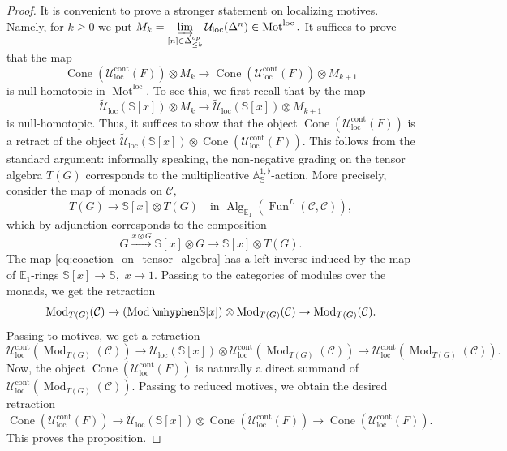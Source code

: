 \documentclass[11pt,leqno]{amsart}
\numberwithin{equation}{section}
\def\A{{\mathbb A}}
\def\bS{\mathbb{S}}
\def\wt{\widetilde}
\newcommand{\hy}{\mhyphen}
\newcommand{\indlim}[1][]{\mathop{\varinjlim}\limits_{#1}}
\newcommand{\xto}{\xrightarrow}
\newcommand{\Mot}{\operatorname{Mot}}
\newcommand{\Cone}{\operatorname{Cone}}
\newcommand{\loc}{\operatorname{loc}}
\newcommand{\cont}{\operatorname{cont}}
\newcommand{\bE}{{\mathbb E}}
\newcommand{\cC}{{\mathcal C}}
\newcommand{\cU}{{\mathcal U}}
\newcommand{\Fun}{\operatorname{Fun}}
\newcommand{\Alg}{\operatorname{Alg}}
\newcommand{\Mod}{\operatorname{Mod}}
\begin{document}
\begin{proof}
It is convenient to prove a stronger statement on localizing motives. Namely, for $k\geq 0$ we put $M_k=\indlim[\substack{[n]\in\Delta_{\leq k}^{op}}] \cU_{\loc}(\Delta^n)\in\Mot^{\loc}.$ It suffices to prove that the map
\begin{equation*}
\Cone(\cU_{\loc}^{\cont}(F))\otimes M_k\to \Cone(\cU_{\loc}^{\cont}(F))\otimes M_{k+1}
\end{equation*}
is null-homotopic in $\Mot^{\loc}.$ To see this, we first recall that by \cite[Proofs of Theorem 8.1 and Proposition 8.2]{E25c} the map
\begin{equation*}
\wt{\cU}_{\loc}(\bS[x])\otimes M_k\to \wt{\cU}_{\loc}(\bS[x])\otimes M_{k+1}
\end{equation*}
is null-homotopic. Thus, it suffices to show that the object $\Cone(\cU_{\loc}^{\cont}(F))$ is a retract of the object $\wt{\cU}_{\loc}(\bS[x])\otimes \Cone(\cU_{\loc}^{\cont}(F)).$ This follows from the standard argument: informally speaking, the non-negative grading on the tensor algebra $T(G)$ corresponds to the multiplicative $\A^{1,\flat}_{\bS}$-action. More precisely, consider the map of monads on $\cC,$
\begin{equation}\label{eq:coaction_on_tensor_algebra}
T(G)\to \bS[x]\otimes T(G)\quad\text{in }\Alg_{\bE_1}(\Fun^L(\cC,\cC)),
\end{equation}
which by adjunction corresponds to the composition
\begin{equation*}
G\xto{x\otimes G}\bS[x]\otimes G\to \bS[x]\otimes T(G).
\end{equation*}
The map \eqref{eq:coaction_on_tensor_algebra} has a left inverse induced by the map of $\bE_1$-rings $\bS[x]\to\bS,$ $x\mapsto 1.$ Passing to the categories of modules over the monads, we get the retraction
\begin{equation*}
\Mod_{T(G)}(\cC)\to (\Mod\hy\bS[x])\otimes \Mod_{T(G)}(\cC)\to \Mod_{T(G)}(\cC). 
\end{equation*}
Passing to motives, we get a retraction
\begin{equation*}
\cU_{\loc}^{\cont}(\Mod_{T(G)}(\cC))\to \cU_{\loc}(\bS[x])\otimes \cU_{\loc}^{\cont}(\Mod_{T(G)}(\cC))\to \cU_{\loc}^{\cont}(\Mod_{T(G)}(\cC)).
\end{equation*}
Now, the object $\Cone(\cU_{\loc}^{\cont}(F))$ is naturally a direct summand of $\cU_{\loc}^{\cont}(\Mod_{T(G)}(\cC)).$ Passing to reduced motives, we obtain the desired retraction
\begin{equation*}
\Cone(\cU_{\loc}^{\cont}(F))\to \wt{\cU}_{\loc}(\bS[x])\otimes \Cone(\cU_{\loc}^{\cont}(F))\to \Cone(\cU_{\loc}^{\cont}(F)).
\end{equation*}
This proves the proposition.
\end{proof}
\end{document}
